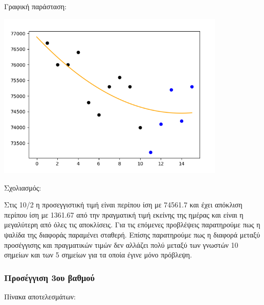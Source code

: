 \documentclass[a4paper,11pt]{article}
\begin{document}
	\hfill \break
	
	Γραφική παράσταση:
	
	\includegraphics[height=8cm]{eydap-2-alt.png}
	
	Σχολιασμός:
	\hfill \break
	
		
	Στις 10/2 η προσεγγιστική τιμή είναι περίπου ίση με 74561.7 και έχει απόκλιση περίπου ίση με 1361.67 από την πραγματική τιμή εκείνης της ημέρας και είναι η μεγαλύτερη από όλες τις αποκλίσεις. Για τις επόμενες προβλέψεις παρατηρούμε πως η ψαλίδα της διαφοράς παραμένει σταθερή. Επίσης παρατηρούμε πως η διαφορά μεταξύ προσέγγισης και πραγματικών τιμών δεν αλλάζει πολύ μεταξύ των γνωστών 10 σημείων και των 5 σημείων για τα οποία έγινε μόνο πρόβλεψη.
	

	\subsubsection{Προσέγγιση 3ου βαθμού}
	
	Πίνακα αποτελεσμάτων:
	
\end{document}
